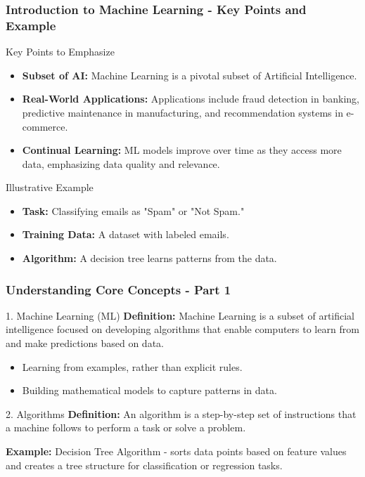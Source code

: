 \documentclass[aspectratio=169]{beamer}
\begin{document}
\begin{frame}[fragile]
    \frametitle{Introduction to Machine Learning - Key Points and Example}
    \begin{block}{Key Points to Emphasize}
        \begin{itemize}
            \item \textbf{Subset of AI:} Machine Learning is a pivotal subset of Artificial Intelligence.
            \item \textbf{Real-World Applications:} Applications include fraud detection in banking, predictive maintenance in manufacturing, and recommendation systems in e-commerce.
            \item \textbf{Continual Learning:} ML models improve over time as they access more data, emphasizing data quality and relevance.
        \end{itemize}
    \end{block}
    \begin{block}{Illustrative Example}
        \begin{itemize}
            \item \textbf{Task:} Classifying emails as "Spam" or "Not Spam."
            \item \textbf{Training Data:} A dataset with labeled emails.
            \item \textbf{Algorithm:} A decision tree learns patterns from the data.
        \end{itemize}
    \end{block}
\end{frame}

\begin{frame}[fragile]
    \frametitle{Understanding Core Concepts - Part 1}
    \begin{block}{1. Machine Learning (ML)}
        \textbf{Definition:}  
        Machine Learning is a subset of artificial intelligence focused on developing algorithms that enable computers to learn from and make predictions based on data.

        \begin{itemize}
            \item Learning from examples, rather than explicit rules.
            \item Building mathematical models to capture patterns in data.
        \end{itemize}
    \end{block}
    
    \begin{block}{2. Algorithms}
        \textbf{Definition:}  
        An algorithm is a step-by-step set of instructions that a machine follows to perform a task or solve a problem.

        \textbf{Example:} Decision Tree Algorithm - sorts data points based on feature values and creates a tree structure for classification or regression tasks.
    \end{block}
\end{frame}
\end{document}
